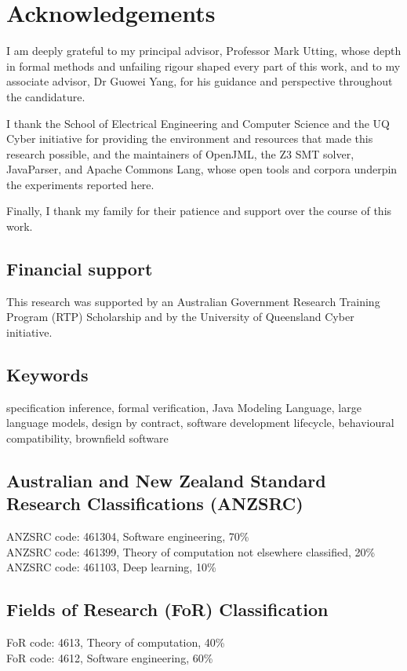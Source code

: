 \chapter*{Acknowledgements}

I am deeply grateful to my principal advisor, Professor Mark Utting, whose depth
in formal methods and unfailing rigour shaped every part of this work, and to my
associate advisor, Dr Guowei Yang, for his guidance and perspective throughout the
candidature.

I thank the School of Electrical Engineering and Computer Science and the UQ Cyber
initiative for providing the environment and resources that made this research
possible, and the maintainers of OpenJML, the Z3 SMT solver, JavaParser, and
Apache Commons Lang, whose open tools and corpora underpin the experiments
reported here.

Finally, I thank my family for their patience and support over the course of this
work.

\bigskip
\section*{Financial support}

This research was supported by an Australian Government Research Training Program
(RTP) Scholarship and by the University of Queensland Cyber initiative.

\bigskip
\section*{Keywords}

specification inference, formal verification, Java Modeling Language, large
language models, design by contract, software development lifecycle, behavioural
compatibility, brownfield software

\section*{Australian and New Zealand Standard Research Classifications (ANZSRC)}

ANZSRC code: 461304, Software engineering, 70\%\\
ANZSRC code: 461399, Theory of computation not elsewhere classified, 20\%\\
ANZSRC code: 461103, Deep learning, 10\%

\section*{Fields of Research (FoR) Classification}

FoR code: 4613, Theory of computation, 40\%\\
FoR code: 4612, Software engineering, 60\%
